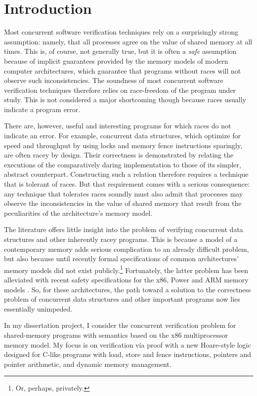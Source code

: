 \documentclass[11pt]{article}
\begin{document}
\section{Introduction}

Most concurrent software verification techniques rely on a
surprisingly strong assumption: namely, that all processes agree on
the value of shared memory at all times. This is, of course, not
generally true, but it is often a \emph{safe} assumption because of
implicit guarantees provided by the memory models of modern computer
architectures, which guarantee that programs without races will not
observe such inconsistencies. The soundness of most concurrent
software verification techniques therefore relies on race-freedom of
the program under study. This is not considered a major shortcoming
though because races usually indicate a program error.

There are, however, useful and interesting programs for which races do not indicate an error. For example, concurrent data structures, which optimize for speed and throughput by using locks and memory fence instructions sparingly, are often racey by design. Their correctness is demonstrated by relating the executions of the comparatively daring implementation to those of its simpler, abstract counterpart. Constructing such a relation therefore requires a technique that is tolerant of races. But that requirement comes with a serious consequence: any technique that tolerates races soundly must also admit that processes may observe the inconsistencies in the value of shared memory that result from the peculiarities of the architecture's memory model.

The literature offers little insight into the problem of verifying concurrent data structures and other inherently racey programs. This is because a model of a contemporary memory adds serious complication to an already difficult problem, but also because until recently formal specifications of common architectures' memory models did not exist publicly.\footnote{Or, perhaps, privately.} Fortunately, the latter problem has been alleviated with recent safety specifications for the x86, Power and ARM memory models \cite{DBLP:conf/tphol/OwensSS09,DBLP:conf/popl/2009damp}. So, for these architectures, the path toward a solution to the correctness problem of concurrent data structures and other important programs now lies essentially unimpeded.

In my dissertation project, I consider the concurrent verification problem for shared-memory programs with semantics based on the x86 multiprocessor memory model. My focus is on verification via proof with a new Hoare-style logic designed for C-like programs with load, store and fence instructions, pointers and pointer arithmetic, and dynamic memory management.
\end{document}
